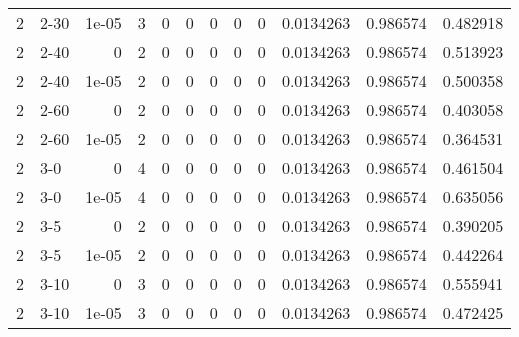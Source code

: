 \begin{tabular}{rlrrrrrrrrrr}
     2 & 2-30   &      1e-05 &           3 &                 0 &                 0 &     0           &     0           &      0           &        0.0134263 &               0.986574 &           0.482918 \\
     2 & 2-40   &      0     &           2 &                 0 &                 0 &     0           &     0           &      0           &        0.0134263 &               0.986574 &           0.513923 \\
     2 & 2-40   &      1e-05 &           2 &                 0 &                 0 &     0           &     0           &      0           &        0.0134263 &               0.986574 &           0.500358 \\
     2 & 2-60   &      0     &           2 &                 0 &                 0 &     0           &     0           &      0           &        0.0134263 &               0.986574 &           0.403058 \\
     2 & 2-60   &      1e-05 &           2 &                 0 &                 0 &     0           &     0           &      0           &        0.0134263 &               0.986574 &           0.364531 \\
     2 & 3-0    &      0     &           4 &                 0 &                 0 &     0           &     0           &      0           &        0.0134263 &               0.986574 &           0.461504 \\
     2 & 3-0    &      1e-05 &           4 &                 0 &                 0 &     0           &     0           &      0           &        0.0134263 &               0.986574 &           0.635056 \\
     2 & 3-5    &      0     &           2 &                 0 &                 0 &     0           &     0           &      0           &        0.0134263 &               0.986574 &           0.390205 \\
     2 & 3-5    &      1e-05 &           2 &                 0 &                 0 &     0           &     0           &      0           &        0.0134263 &               0.986574 &           0.442264 \\
     2 & 3-10   &      0     &           3 &                 0 &                 0 &     0           &     0           &      0           &        0.0134263 &               0.986574 &           0.555941 \\
     2 & 3-10   &      1e-05 &           3 &                 0 &                 0 &     0           &     0           &      0           &        0.0134263 &               0.986574 &           0.472425 \\

\end{tabular}
